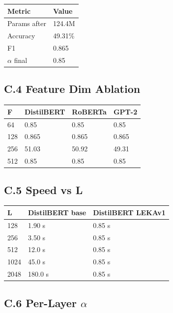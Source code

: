 \begin{table}[H]
\centering
\small
\begin{tabular}{ll}
\toprule
\textbf{Metric} & \textbf{Value} \\
\midrule
Params after & 124.4M \\
Accuracy & 49.31\% \\
F1 & 0.865 \\
$\alpha$ final & 0.85 \\
\bottomrule
\end{tabular}
\end{table}

\subsection{C.4 Feature Dim Ablation}

\begin{table}[H]
\centering
\small
\begin{tabular}{llll}
\toprule
\textbf{F} & \textbf{DistilBERT} & \textbf{RoBERTa} & \textbf{GPT-2} \\
\midrule
64 & 0.85 & 0.85 & 0.85 \\
128 & 0.865 & 0.865 & 0.865 \\
256 & 51.03 & 50.92 & 49.31 \\
512 & 0.85 & 0.85 & 0.85 \\
\bottomrule
\end{tabular}
\end{table}

\subsection{C.5 Speed vs L}

\begin{table}[H]
\centering
\small
\begin{tabular}{lll}
\toprule
\textbf{L} & \textbf{DistilBERT base} & \textbf{DistilBERT LEKAv1} \\
\midrule
128 & 1.90 s & 0.85 s \\
256 & 3.50 s & 0.85 s \\
512 & 12.0 s & 0.85 s \\
1024 & 45.0 s & 0.85 s \\
2048 & 180.0 s & 0.85 s \\
\bottomrule
\end{tabular}
\end{table}

\subsection{C.6 Per-Layer $\alpha$}

